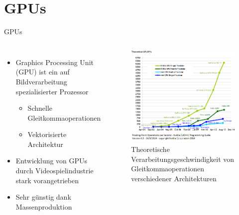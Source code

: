 \documentclass[10pt]{beamer}
\begin{document}
\section{GPUs}

\begin{frame}{GPUs}
  \begin{columns}
      \begin{itemize}
        \item Graphics Processing Unit (GPU) ist ein auf Bildverarbeitung
              spezialisierter Prozessor
        \begin{itemize}
          \item Schnelle Gleitkommaoperationen
          \item Vektorisierte Architektur
        \end{itemize}
        \item Entwicklung von GPUs durch Videospielindustrie stark
              vorangetrieben
        \item Sehr günstig dank Massenproduktion
      \end{itemize}
      \begin{figure}
        \centering
        \includegraphics[width=\linewidth]{figures/fg-flops.png}
        \caption{Theoretische Verarbeitungsgeschwindigkeit von
                 Gleitkommaoperationen verschiedener
                 Architekturen\footnotemark[1]}
      \end{figure}
  \end{columns}

\end{frame}
\end{document}
